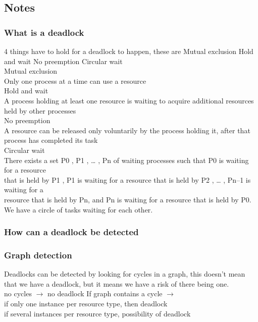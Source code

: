 \documentclass[a4paper,10pt,titlepage]{report}
\begin{document}
\subsection{Notes}
\subsubsection{What is a deadlock}
4 things have to hold for a deadlock to happen, these are Mutual exclusion
Hold and wait
No preemption
Circular wait
\\
Mutual exclusion\\
\hspace{10mm} Only one process at a time can use a resource\\
Hold and wait\\
\hspace{10mm} A process holding at least one resource is waiting to acquire additional
resources held by other processes \\
No preemption\\
\hspace{10mm} A resource can be released only voluntarily by the process holding it, after
that process has completed its task \\ 
Circular wait\\
\hspace{10mm} There exists a set {P0 , P1 , … , Pn } of waiting processes such that P0 is waiting
for a resource \\
\hspace{10mm} that is held by P1 , P1 is waiting for a resource that is held by
P2 , … , Pn–1 is waiting for a \\
\hspace{10mm}resource that is held by Pn, and Pn is waiting for a
resource that is held by P0. \\
\vspace{2mm} 
\hspace{10mm}We have a circle of tasks waiting for each other.
\\
\subsubsection{How can a deadlock be detected}

\subsubsection{Graph detection}
Deadlocks can be detected by looking for cycles in a graph, this doesn't mean that we have a deadlock, but it means we have a risk of there being one.\\
no cycles  $\rightarrow $ no deadlock
If graph contains a cycle $\rightarrow $ \\
\hspace{10mm} if only one instance per resource type, then deadlock
\\
\hspace{10mm} if several instances per resource type, possibility of deadlock
\end{document}
